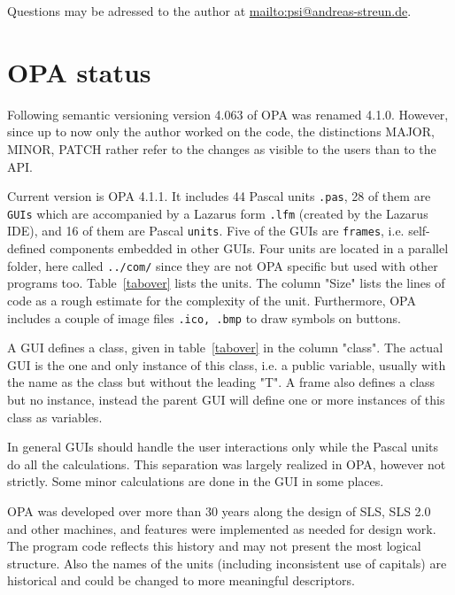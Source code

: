 \documentclass[12pt]{article}
\newcommand\code[1]{{\tt #1}}
\newcommand{\opagui}[1]{\colorbox{blue!20}{\code{#1}}}
\newcommand{\opaguif}[1]{\colorbox{violet!30}{\code{#1}}}
\newcommand{\opauni}[1]{\colorbox{orange!30}{\code{#1}}}
\begin{document}
Questions may be adressed to the author at \url{mailto:psi@andreas-streun.de}.

\newpage


\section{OPA status}

Following semantic versioning \cite{semver} version 4.063 of OPA was renamed 4.1.0. However, since up to now only the author worked on the code, the distinctions MAJOR, MINOR, PATCH rather refer to the changes as visible to the users than to the API. 


Current version is OPA 4.1.1. It includes 44 Pascal units \code{.pas}, 28 of them are \opagui{GUIs} which are accompanied by a Lazarus form \code{.lfm} (created by the Lazarus IDE), and 16 of them are Pascal \opauni{units}. Five of the GUIs are \opaguif{frames}, i.e. self-defined components embedded in other GUIs. Four units are located in a parallel folder, here called \code{../com/} since they are not OPA specific but used with other programs too.
Table~\ref{tabover} lists the units. The column "Size" lists the lines of code as a rough estimate for the complexity of the unit. Furthermore, OPA includes a couple of image files \code{.ico, .bmp} to draw symbols on buttons. 

A GUI defines a class, given in table~\ref{tabover} in the column "class". The actual GUI is the one and only instance of this class, i.e. a public variable, usually with the name as the class but without the leading "T". A frame also defines a class but no instance, instead the parent GUI will define one or more instances of this class as variables.

In general GUIs should handle the user interactions only while the Pascal units do all the calculations. This separation was largely realized in OPA, however not strictly. Some minor calculations are done in the GUI in some places.

OPA was developed over more than 30 years along the design of SLS, SLS 2.0 and other machines, and features were implemented as needed for design work. The program code reflects this history and may not present the most logical structure. Also the names of the units (including inconsistent use of capitals) are historical and could be changed to more meaningful descriptors.\\
\end{document}
